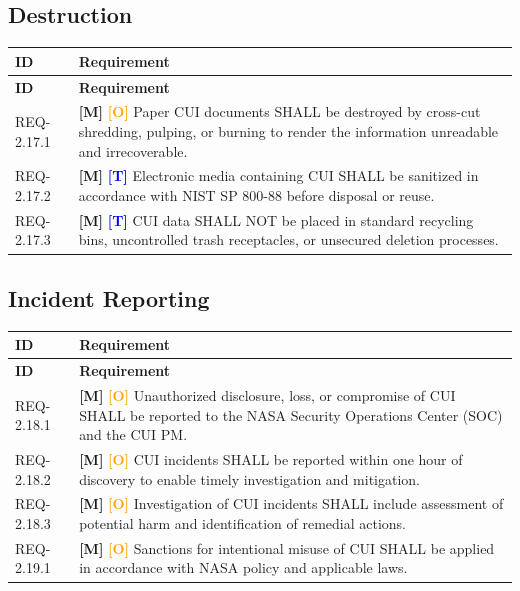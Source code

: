 \documentclass[11pt,letterpaper]{article}
\begin{document}
\subsection{Destruction}

\begin{longtable}{@{}p{1.4cm}p{11.6cm}@{}}
\toprule
\textbf{ID} & \textbf{Requirement} \\
\midrule
\endfirsthead
\toprule
\textbf{ID} & \textbf{Requirement} \\
\midrule
\endhead

REQ-2.17.1 & \textcolor{mandatory}{\textbf{[M]}} \textcolor{orange}{\textbf{[O]}} Paper CUI documents SHALL be destroyed by cross-cut shredding, pulping, or burning to render the information unreadable and irrecoverable. \\[6pt]

REQ-2.17.2 & \textcolor{mandatory}{\textbf{[M]}} \textcolor{blue}{\textbf{[T]}} Electronic media containing CUI SHALL be sanitized in accordance with NIST SP 800-88 before disposal or reuse. \\[6pt]

REQ-2.17.3 & \textcolor{mandatory}{\textbf{[M]}} \textcolor{blue}{\textbf{[T]}} CUI data SHALL NOT be placed in standard recycling bins, uncontrolled trash receptacles, or unsecured deletion processes. \\[6pt]

\bottomrule
\end{longtable}

\subsection{Incident Reporting}

\begin{longtable}{@{}p{1.4cm}p{11.6cm}@{}}
\toprule
\textbf{ID} & \textbf{Requirement} \\
\midrule
\endfirsthead
\toprule
\textbf{ID} & \textbf{Requirement} \\
\midrule
\endhead

REQ-2.18.1 & \textcolor{mandatory}{\textbf{[M]}} \textcolor{orange}{\textbf{[O]}} Unauthorized disclosure, loss, or compromise of CUI SHALL be reported to the NASA Security Operations Center (SOC) and the CUI PM. \\[6pt]

REQ-2.18.2 & \textcolor{mandatory}{\textbf{[M]}} \textcolor{orange}{\textbf{[O]}} CUI incidents SHALL be reported within one hour of discovery to enable timely investigation and mitigation. \\[6pt]

REQ-2.18.3 & \textcolor{mandatory}{\textbf{[M]}} \textcolor{orange}{\textbf{[O]}} Investigation of CUI incidents SHALL include assessment of potential harm and identification of remedial actions. \\[6pt]

REQ-2.19.1 & \textcolor{mandatory}{\textbf{[M]}} \textcolor{orange}{\textbf{[O]}} Sanctions for intentional misuse of CUI SHALL be applied in accordance with NASA policy and applicable laws. \\[6pt]

\bottomrule
\end{longtable}
\end{document}
